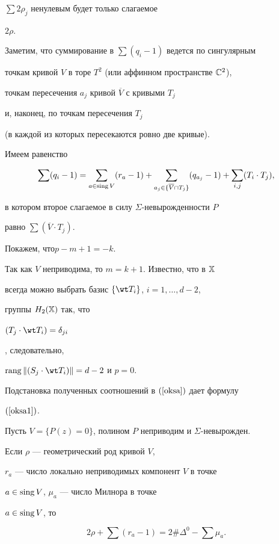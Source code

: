$\sum 2\rho_j$ ненулевым будет только слагаемое


$2\rho$.


Заметим, что суммирование в $\sum (q_i-1)$ ведется по сингулярным


точкам кривой $V$ в торе $T^2$ (или аффинном пространстве $\Bbb C^2$),


точкам пересечения $a_j$ кривой $\overline{V}$ с кривыми $T_j$


и, наконец, по точкам пересечения $T_j$


(в каждой из которых пересекаются ровно две кривые).


Имеем равенство


$$


\sum (q_i-1)=


\sum\limits_{a\in\sing V} (r_a-1)+


\sum\limits_{a_j\in \{\overline{V}\cap T_j\} } (q_{a_j}-1)+


\sum\limits_{i,j} (T_i\cdot T_j),


$$


в котором второе слагаемое в силу $\Sigma$-невырожденности $P$


равно $\sum (\overline{V}\cdot T_j)$.


Покажем, что\linebreak $p-m+1=-k$.


Так как $V$ неприводима, то $m=k+1$. Известно, что в $\Bbb X$


всегда можно выбрать базис $\{\wt T_i\}$, $i=1,\dotsc,d-2$,


группы $H_2(\Bbb X)$ так, что


$(T_j\cdot \wt T_i)=\delta_{ji}$


\cite{AP}, следовательно,


$\rang \|(S_j\cdot \wt T_i)\|=d-2$ и $p=0$.





Подстановка полученных соотношений в $(\ref{oksa})$ дает формулу


$(\ref{oksa1})$.





\begin{lem}


Пусть $V=\{P(z)=0\}$, полином $P$ неприводим и $\Sigma$-невырожден.


Если $\rho$ --- геометрический род кривой $V$,


$r_a$ --- число локально неприводимых компонент $V$ в точке


$a\in \operatorname{sing} V$, $\mu_a$ --- число Милнора в точке


$a\in\operatorname{sing} V$, то


\begin{equation}


\label{tri}


2\rho + \sum (r_a - 1) = 2\#\Delta^0 - \sum \mu_a.


\end{equation}


\end{lem}





